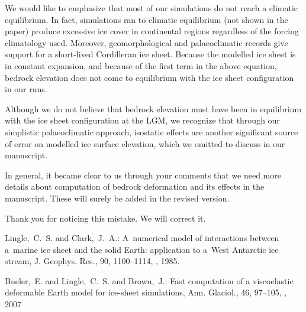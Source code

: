 \documentclass[10pt]{article}
\begin{document}
We would like to emphasize that most of our simulations do not reach a climatic equilibrium. In fact, simulations ran to climatic equilibrium (not shown in the paper) produce excessive ice cover in continental regions regardless of the forcing climatology used. Moreover, geomorphological and palaeoclimatic records give support for a short-lived Cordilleran ice sheet. Because the modelled ice sheet is in constant expansion, and because of the first term in the above equation, bedrock elevation does not come to equilibrium with the ice sheet configuration in our runs.

Although we do not believe that bedrock elevation must have been in equilibrium with the ice sheet configuration at the LGM, we recognize that through our simplistic palaeoclimatic approach, isostatic effects are another significant source of error on modelled ice surface elevation, which we omitted to discuss in our manuscript.

In general, it became clear to us through your comments that we need more details about computation of bedrock deformation and its effects in the manuscript. These will surely be added in the revised version.


Thank you for noticing this mistake. We will correct it.

\begin{thebibliography}{69}

Lingle,~C.~S. and Clark,~J.~A.: A~numerical model of interactions between a~marine ice sheet and the solid Earth: application to a~West Antarctic ice stream, J. Geophys. Res., 90, 1100--1114, , 1985.

Bueler,~E. and Lingle,~C.~S. and Brown,~J.: Fast computation of a viscoelastic deformable Earth model for ice-sheet simulations, Ann. Glaciol., 46, 97--105, , 2007

\end{thebibliography}

\end{document}
